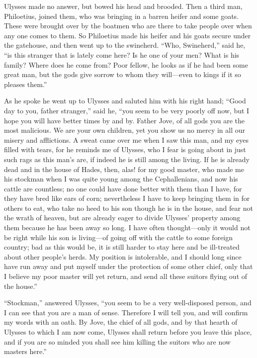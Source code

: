 Ulysses made no answer, but bowed his head and brooded. Then a third man,
Philoetius, joined them, who was bringing in a barren heifer and some goats.
These were brought over by the boatmen who are there to take people over when
any one comes to them. So Philoetius made his heifer and his goats secure under
the gatehouse, and then went up to the swineherd. “Who, Swineherd,” said he,
“is this stranger that is lately come here? Is he one of your men? What is his
family? Where does he come from? Poor fellow, he looks as if he had been some
great man, but the gods give sorrow to whom they will—even to kings if it so
pleases them.”

As he spoke he went up to Ulysses and saluted him with his right hand; “Good
day to you, father stranger,” said he, “you seem to be very poorly off now, but
I hope you will have better times by and by. Father Jove, of all gods you are
the most malicious. We are your own children, yet you show us no mercy in all
our misery and afflictions. A sweat came over me when I saw this man, and my
eyes filled with tears, for he reminds me of Ulysses, who I fear is going about
in just such rags as this man’s are, if indeed he is still among the living. If
he is already dead and in the house of Hades, then, alas! for my good master,
who made me his stockman when I was quite young among the Cephallenians, and
now his cattle are countless; no one could have done better with them than I
have, for they have bred like ears of corn; nevertheless I have to keep
bringing them in for others to eat, who take no heed to his son though he is in
the house, and fear not the wrath of heaven, but are already eager to divide
Ulysses’ property among them because he has been away so long. I have often
thought—only it would not be right while his son is living—of going off with
the cattle to some foreign country; bad as this would be, it is still harder to
stay here and be ill-treated about other people’s herds. My position is
intolerable, and I should long since have run away and put myself under the
protection of some other chief, only that I believe my poor master will yet
return, and send all these suitors flying out of the house.”

“Stockman,” answered Ulysses, “you seem to be a very well-disposed person, and
I can see that you are a man of sense. Therefore I will tell you, and will
confirm my words with an oath. By Jove, the chief of all gods, and by that
hearth of Ulysses to which I am now come, Ulysses shall return before you leave
this place, and if you are so minded you shall see him killing the suitors who
are now masters here.”

